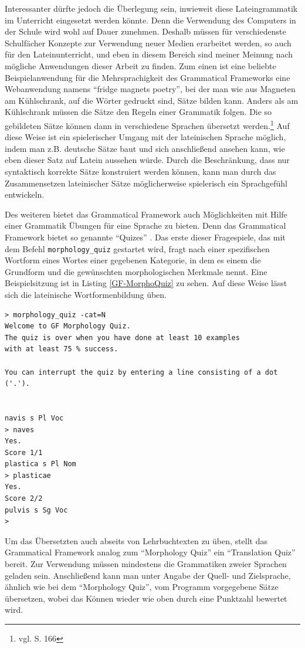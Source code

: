 Interessanter dürfte jedoch die Überlegung sein, inwieweit diese Lateingrammatik im Unterricht eingesetzt werden könnte. Denn die Verwendung des Computers in der Schule wird wohl auf Dauer zunehmen. Deshalb müssen für verschiedenste Schulfächer Konzepte zur Verwendung neuer Medien erarbeitet werden, so auch für den Lateinunterricht, und eben in diesem Bereich sind meiner Meinung nach mögliche Anwendungen dieser Arbeit zu finden. Zum einen ist eine beliebte Beispielanwendung für die Mehrsprachigkeit des Grammatical Frameworks eine Webanwendung namens "`fridge magnets poetry"', bei der man wie aus Magneten am Kühlschrank, auf die Wörter gedruckt sind, Sätze bilden kann. Anders als am Kühlschrank müssen die Sätze den Regeln einer Grammatik folgen. Die so gebildeten Sätze können dann in verschiedene Sprachen übersetzt werden.\footnote{vgl. \cite{RANTA2011} S. 166} Auf diese Weise ist ein spielerischer Umgang mit der lateinischen Sprache möglich, indem man z.B. deutsche Sätze baut und sich anschließend ansehen kann, wie eben dieser Satz auf Latein aussehen würde. Durch die Beschränkung, dass nur syntaktisch korrekte Sätze konstruiert werden können, kann man durch das Zusammensetzen lateinischer Sätze möglicherweise spielerisch ein Sprachgefühl entwickeln. \par
Des weiteren bietet das Grammatical Framework auch Möglichkeiten mit Hilfe einer Grammatik Übungen für eine Sprache zu bieten. Denn das Grammatical Framework bietet so genannte ``Quizes'' . Das erste dieser Fragespiele, das mit dem Befehl \texttt{morphology\_quiz} gestartet wird, fragt nach einer spezifischen Wortform eines Wortes einer gegebenen Kategorie, in dem es einem die Grundform und die gewünschten morphologischen Merkmale nennt. Eine Beispielsitzung ist in Listing \ref{GF-MorphoQuiz} zu sehen. Auf diese Weise lässt sich die lateinische Wortformenbildung üben.
\begin{lstlisting}[float=h!tp,caption={Eine Beispielsitzung des Grammatical Framework Morphology Quiz},label={GF-MorphoQuiz},basicstyle=\small]
> morphology_quiz -cat=N
Welcome to GF Morphology Quiz.
The quiz is over when you have done at least 10 examples
with at least 75 % success.

You can interrupt the quiz by entering a line consisting of a dot ('.').


navis s Pl Voc
> naves
Yes.
Score 1/1
plastica s Pl Nom
> plasticae
Yes.
Score 2/2
pulvis s Sg Voc
>
\end{lstlisting}
Um das Übersetzten auch abseits von Lehrbuchtexten zu üben, stellt das Grammatical Framework analog zum ``Morphology Quiz'' ein ``Translation Quiz'' bereit. Zur Verwendung müssen mindestens die Grammatiken zweier Sprachen geladen sein. Anschließend kann man unter Angabe der Quell- und Zielsprache, ähnlich wie bei dem ``Morphology Quiz'', vom Programm vorgegebene Sätze übersetzen, wobei das Können wieder wie oben durch eine Punktzahl bewertet wird. \par
